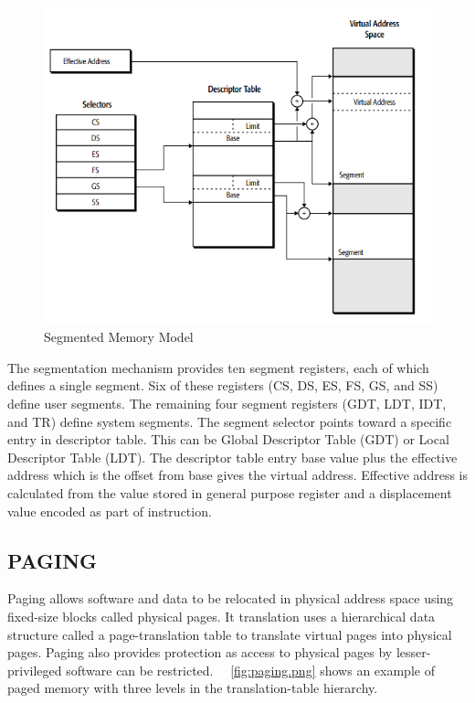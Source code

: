 \documentclass[a4paper,12pt]{report}
\begin{document}
\begin{figure}[H]
\centering
\includegraphics[scale=0.5]{./figures/segmentation.png}
\caption{Segmented Memory Model}
\label{fig:segmentation.png}
\end{figure}


The segmentation mechanism provides ten segment registers, each of which defines a single segment. Six of these registers (CS, DS, ES, FS, GS, and SS) define user segments. The remaining four segment registers (GDT, LDT, IDT, and TR) define system segments. The segment selector points toward a specific entry in descriptor table. This can be Global Descriptor Table (GDT) or Local Descriptor Table (LDT). The descriptor table entry base value plus the effective address which is the offset from base gives the virtual address. Effective address is calculated from the value stored in general purpose register and a displacement value encoded as part of instruction.

\subsection{PAGING}
Paging allows software and data to be relocated in physical address space using fixed-size blocks called physical pages. It translation uses a hierarchical data structure called a page-translation table to translate virtual pages into physical pages. Paging also provides protection as access to physical pages by lesser-privileged software can be restricted. ~\figurename~{\ref{fig:paging.png}} shows an example of paged memory with three levels in the translation-table hierarchy. 
\end{document}

